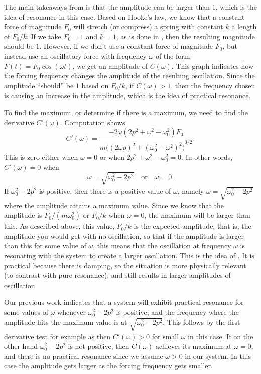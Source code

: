 \documentclass{ximera}
\begin{document}
The main takeaways from  is that the amplitude can be larger than 1, which is the idea of resonance in this case. Based on Hooke's law, we know that a constant force of magnitude $F_0$ will stretch (or compress) a spring with constant $k$ a length of $F_0/k$. If we take $F_0 = 1$ and $k=1$, as is done in , then the resulting magnitude should be $1$. However, if we don't use a constant force of magnitude $F_0$, but instead use an oscillatory force with frequency $\omega$ of the form $F(t) = F_0 \cos{(\omega t)}$, we get an amplitude of $C(\omega)$. This graph indicates how the forcing frequency changes the amplitude of the resulting oscillation. Since the amplitude ``should'' be $1$ based on $F_0/k$, if $C(\omega) > 1$, then the frequency chosen is causing an increase in the amplitude, which is the idea of practical resonance. 

To find the maximum, or determine if there is a maximum, we need to find the derivative $C'(\omega)$. Computation shows
\begin{equation*}
    C'(\omega) = \frac{- 2\omega( 2p^2+\omega^2-\omega_0^2)F_0} {m {\bigl({(2\omega p)}^2+{(\omega_0^2-\omega^2)}^2\bigr)}^{3/2}} .
\end{equation*}
This is zero either when $\omega = 0$ or when $2p^2+\omega^2-\omega_0^2 = 0$.  In other words, $C'(\omega) = 0$ when
\begin{equation*}
    \omega = \sqrt{\omega_0^2 - 2p^2} \quad \text{or} \quad \omega = 0 .
\end{equation*}
If $\omega_0^2 - 2p^2$ is positive, then there is a positive value of $\omega$, namely $\omega = \sqrt{\omega_0^2 - 2p^2}$ where the amplitude attains a maximum value. Since we know that the amplitude is $F_0/(m\omega_0^2)$ or $F_0/k$ when $\omega = 0$, the maximum will be larger than this. As described above, this value, $F_0/k$ is the expected amplitude, that is, the amplitude you would get with no oscillation, so that if the amplitude is larger than this for some value of $\omega$, this means that the oscillation at frequency $\omega$ is resonating with the system to create a larger oscillation. This is the idea of \emph{}. It is practical because there is damping, so the situation is more physically relevant (to contrast with pure resonance), and still results in larger amplitudes of oscillation. 

Our previous work indicates that a system will exhibit practical resonance for some values of $\omega$ whenever $\omega_0^2 - 2p^2$ is positive, and the frequency where the amplitude hits the maximum value is at $\sqrt{\omega_0^2 - 2p^2}$. This follows by the first derivative test for example as then $C'(\omega) > 0$ for small $\omega$ in this case. If on the other hand $\omega_0^2 - 2p^2$ is not positive, then $C(\omega)$ achieves its maximum at $\omega=0$, and there is no practical resonance since we assume $\omega > 0$ in our system.  In this case the amplitude gets larger as the forcing frequency gets smaller.
\end{document}
